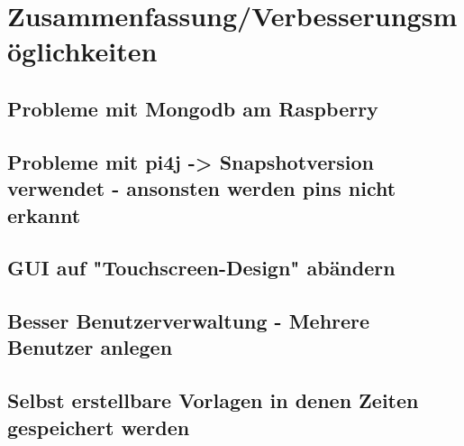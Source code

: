 \section{Zusammenfassung/Verbesserungsmöglichkeiten}
\subsection{Probleme mit Mongodb am Raspberry}
\subsection{Probleme mit pi4j -> Snapshotversion verwendet - ansonsten werden pins nicht erkannt}
\subsection{GUI auf "Touchscreen-Design" abändern}
\subsection{Besser Benutzerverwaltung - Mehrere Benutzer anlegen}
\subsection{Selbst erstellbare Vorlagen in denen Zeiten gespeichert werden}

